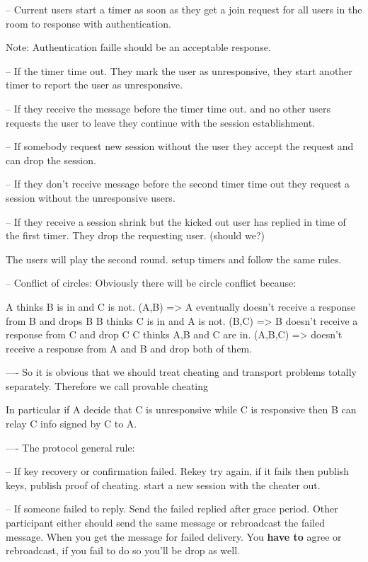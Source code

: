 \documentclass[11pt]{article}
\begin{document}
-- Current users start a timer as soon as they get a join request for 
   all users in the room to response with authentication. 

Note: Authentication faille should be an acceptable response.

-- If the timer time out. They mark the user as unresponsive, they start
   another timer to report the user as unresponsive.

-- If they receive the message before the timer time out.
   and no other users requests the user to leave they continue with
   the session establishment.

-- If somebody request new session without the user they accept
   the request and can drop the session.

-- If they don't receive message before the second timer time
   out they request a session without the unresponsive users.

-- If they receive  a session shrink but the kicked out user
   has replied in time of the first timer. They drop the requesting
   user. (should we?)

The users will play the second round. setup timers and follow the same 
rules.

-- Conflict of circles:
   Obviously there will be circle conflict because:

A thinks B is in and C is not. (A,B) => A eventually doesn't receive a response from B and drops B
B thinks C is in and A is not. (B,C) =>  B doesn't receive a response from C and drop C
C thinks A,B and C are in. (A,B,C) => doesn't receive a response from A and B and drop both of them.

----
So it is obvious that we should treat cheating and transport problems totally 
separately. Therefore we call provable cheating 

In particular if A decide that C is unresponsive while C is responsive then
B can relay C info signed by C to A.

----
The protocol general rule:

-- If key recovery or confirmation failed. Rekey try again, if it fails then publish 
keys, publish proof of cheating. start a new session with the cheater out.

-- If someone failed to reply. Send the failed replied after grace period. Other participant
either should send the same message or rebroadcast the failed message. When 
you get the message for failed delivery. You \textbf{have to} agree or rebroadcast, if
you fail to do so you'll be drop as well.
\end{document}

